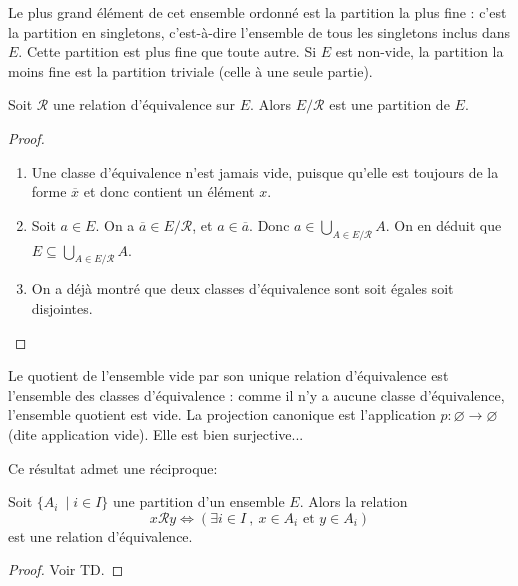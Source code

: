 \begin{remarque}
Le plus grand élément de cet ensemble ordonné est la partition la  plus fine : c'est la partition en singletons, c'est-à-dire l'ensemble de tous les singletons inclus dans $E$. Cette partition est plus fine que toute autre. Si $E$ est non-vide, la partition la moins fine est la partition triviale (celle à une seule partie).  
\end{remarque}



\begin{proposition}
Soit $\mathcal R$ une relation d'équivalence sur $E$. Alors $E/\mathcal R$ est une partition de $E$.
\end{proposition}
\begin{proof}
\begin{enumerate}
\item Une classe d'équivalence n'est jamais vide, puisque qu'elle est toujours de la forme $\overline{x}$ et donc contient un élément $x$.
\item Soit $a\in E$. On a $\overline{a} \in E/\mathcal R$, et $a\in \overline{a}$. Donc $a\in \bigcup_{A\in E/\mathcal R} A$. On en déduit que $E\subseteq \bigcup_{A\in E/\mathcal R} A$.
\item On a déjà montré que deux classes d'équivalence sont soit égales soit disjointes.
\end{enumerate}
\end{proof}

\begin{remarque}[Zérologie] Le quotient de l'ensemble vide par son unique relation d'équivalence est l'ensemble des classes d'équivalence : comme il n'y a aucune classe d'équivalence, l'ensemble quotient est vide. La projection canonique est l'application $p : \varnothing \to \varnothing$ (dite application vide). Elle est bien surjective...
\end{remarque}

Ce résultat admet une \og réciproque\fg : 

\begin{proposition}
Soit $\{A_i\:\mid i\in I\}$ une partition d'un ensemble $E$. Alors la relation
\[
x\mathcal R y \iff \left( \exists i\in I\:,\: x\in A_i\text{ et } y\in A_i\right)
\]
est une relation d'équivalence.
\end{proposition}
\begin{proof}
Voir TD.
\end{proof}

